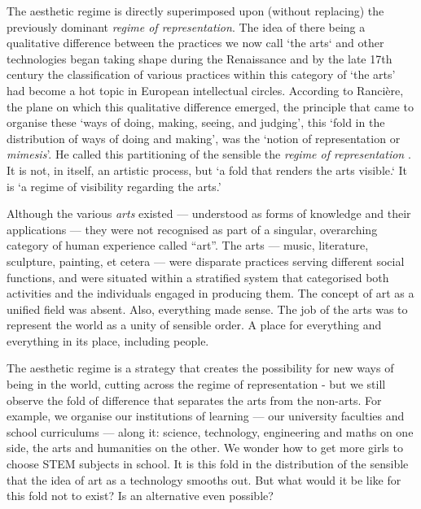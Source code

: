 \documentclass[letterpaper]{article}
\begin{document}
    The aesthetic regime is directly superimposed upon (without replacing) the previously dominant \emph{regime of representation}. The idea of there being a qualitative difference between the practices we now call ‘the arts‘ and other technologies began taking shape during the Renaissance \citep[p.136]{TatarkiewiczWhtIsArt1971} and by the late 17th century the classification of various practices within this category of ‘the arts’ had become a hot topic in European intellectual circles. According to Rancière, the plane on which this qualitative difference emerged, the principle that came to organise these ‘ways of doing, making, seeing, and judging’, this ‘fold in the distribution of ways of doing and making’, was the ‘notion of representation or \emph{mimesis}’. He called this partitioning of the sensible the \emph{regime of representation} \citep[p.22]{RancierPltcsOfThAsthtcs2004}. It is not, in itself, an artistic process, but ‘a fold that renders the arts visible.‘ It is  ‘a regime of visibility regarding the arts.’
    
    Although the various \emph{arts} existed — understood as forms of knowledge and their applications — they were not recognised as part of a singular, overarching category of human experience called “art”. The arts — music, literature, sculpture, painting, et cetera — were disparate practices serving different social functions, and were situated within a stratified system that categorised both activities and the individuals engaged in producing them. The concept of art as a unified field was absent. Also, everything made sense. The job of the arts was to represent the world as a unity of sensible order. A place for everything and everything in its place, including people.
    
    The aesthetic regime is a strategy that creates the possibility for new ways of being in the world, cutting across the regime of representation - but we still observe the fold of difference that separates the arts from the non-arts. For example, we organise our institutions of learning — our university faculties and school curriculums — along it: science, technology, engineering and maths on one side, the arts and humanities on the other. We wonder how to get more girls to choose STEM subjects in school. It is this fold in the distribution of the sensible that the idea of art as a technology smooths out. But what would it be like for this fold not to exist? Is an alternative even possible?
\end{document}
